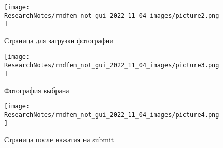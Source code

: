 \begin{figure}[!ht]
  \centering
  \texttt{[image: ResearchNotes/rndfem\_not\_gui\_2022\_11\_04\_images/picture2.png]}
  \caption{Страница для загрузки фотографии}
  \label{picture2}
\end{figure}

\begin{figure}[!ht]
  \centering
  \texttt{[image: ResearchNotes/rndfem\_not\_gui\_2022\_11\_04\_images/picture3.png]}
  \caption{Фотография выбрана}
  \label{picture3}
\end{figure}

\begin{figure}[!ht]
  \centering
  \texttt{[image: ResearchNotes/rndfem\_not\_gui\_2022\_11\_04\_images/picture4.png]}
  \caption{Страница после нажатия на submit}
  \label{picture4}
\end{figure}
\noteattributes{}

